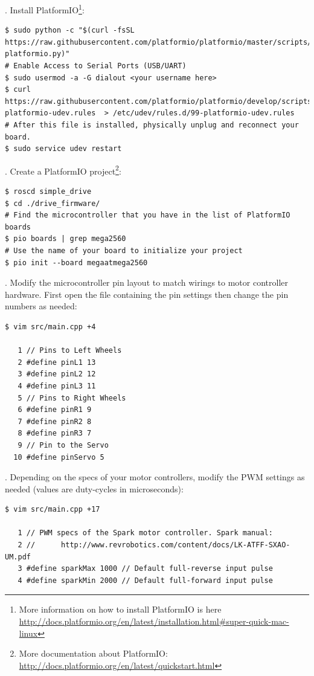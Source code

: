 \documentclass[runningheads,a4paper]{llncs}
\begin{document}
. Install PlatformIO\footnote{More information on how to install PlatformIO is here \url{http://docs.platformio.org/en/latest/installation.html#super-quick-mac-linux}}:

\begin{lstlisting}[frame=single,basicstyle=\ttfamily\footnotesize]
$ sudo python -c "$(curl -fsSL https://raw.githubusercontent.com/platformio/platformio/master/scripts/get-platformio.py)"
# Enable Access to Serial Ports (USB/UART)
$ sudo usermod -a -G dialout <your username here>
$ curl https://raw.githubusercontent.com/platformio/platformio/develop/scripts/99-platformio-udev.rules  > /etc/udev/rules.d/99-platformio-udev.rules
# After this file is installed, physically unplug and reconnect your board.
$ sudo service udev restart
\end{lstlisting}


. Create a PlatformIO project\footnote{More documentation about PlatformIO: \url{http://docs.platformio.org/en/latest/quickstart.html}}:

\begin{lstlisting}[frame=single,basicstyle=\ttfamily\footnotesize]
$ roscd simple_drive
$ cd ./drive_firmware/
# Find the microcontroller that you have in the list of PlatformIO boards
$ pio boards | grep mega2560
# Use the name of your board to initialize your project
$ pio init --board megaatmega2560
\end{lstlisting}


. Modify the microcontroller pin layout to match wirings to motor controller hardware. First open the file containing the pin settings then change the pin numbers as needed:

\begin{lstlisting}[frame=single,basicstyle=\ttfamily\footnotesize]
$ vim src/main.cpp +4

   1 // Pins to Left Wheels
   2 #define pinL1 13
   3 #define pinL2 12
   4 #define pinL3 11
   5 // Pins to Right Wheels
   6 #define pinR1 9
   7 #define pinR2 8
   8 #define pinR3 7
   9 // Pin to the Servo
  10 #define pinServo 5
\end{lstlisting}

. Depending on the specs of your motor controllers, modify the PWM settings as needed (values are duty-cycles in microseconds):

\begin{lstlisting}[frame=single,basicstyle=\ttfamily\footnotesize]
$ vim src/main.cpp +17

   1 // PWM specs of the Spark motor controller. Spark manual:
   2 //      http://www.revrobotics.com/content/docs/LK-ATFF-SXAO-UM.pdf
   3 #define sparkMax 1000 // Default full-reverse input pulse
   4 #define sparkMin 2000 // Default full-forward input pulse
\end{lstlisting}
 
\end{document}
